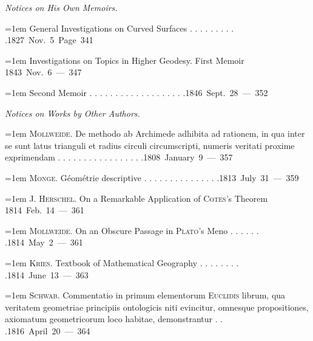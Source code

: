 \par{}%
\begingroup\fontsize{10.5}{13}\selectfont{}
\par\medskip{}
\noindent\textit{Notices on His Own Memoirs.}\par
\par\noindent\hangindent=1em General Investigations on Curved Surfaces . . . . . . . . . .\hfill{}\hbox{}\nobreak\hfill\mbox{1827 Nov. 5 Page 341}\par
\par\noindent\hangindent=1em Investigations on Topics in Higher Geodesy. First Memoir \hfill{}\hbox{}\nobreak\hfill\mbox{1843 Nov. 6 — 347}\par
\par\noindent\hangindent=1em Second Memoir . . . . . . . . . . . . . . . . . . .\hfill{}\hbox{}\nobreak\hfill\mbox{1846 Sept. 28 — 352}\par
\par\medskip{}
\noindent\textit{Notices on Works by Other Authors.}\par
\par\noindent\hangindent=1em \textsc{Mollweide}. De methodo ab Archimede adhibita ad rationem, in qua inter se sunt latus trianguli et radius circuli circumscripti, numeris veritati proxime exprimendam . . . . . . . . . . . . . . . . .\hfill{}\hbox{}\nobreak\hfill\mbox{1808 January 9 — 357}\par
\par\noindent\hangindent=1em \textsc{Monge}. Géométrie descriptive . . . . . . . . . . . . . . .\hfill{}\hbox{}\nobreak\hfill\mbox{1813 July 31 — 359}\par
\par\noindent\hangindent=1em J. \textsc{Herschel}. On a Remarkable Application of \textsc{Cotes}’s Theorem \hfill{}\hbox{}\nobreak\hfill\mbox{1814 Feb. 14 — 361}\par
\par\noindent\hangindent=1em \textsc{Mollweide}. On an Obscure Passage in \textsc{Plato}’s Meno . . . . . . .\hfill{}\hbox{}\nobreak\hfill\mbox{1814 May 2 — 361}\par
\par\noindent\hangindent=1em \textsc{Kries}. Textbook of Mathematical Geography . . . . . . . . .\hfill{}\hbox{}\nobreak\hfill\mbox{1814 June 13 — 363}\par
\par\noindent\hangindent=1em \textsc{Schwab}. Commentatio in primum elementorum \textsc{Euclidis} librum, qua veritatem geometriae principiis ontologicis niti evincitur, omnesque propositiones, axiomatum geometricorum loco habitae, demonstrantur . . .\hfill{}\hbox{}\nobreak\hfill\mbox{1816 April 20 — 364}\par
